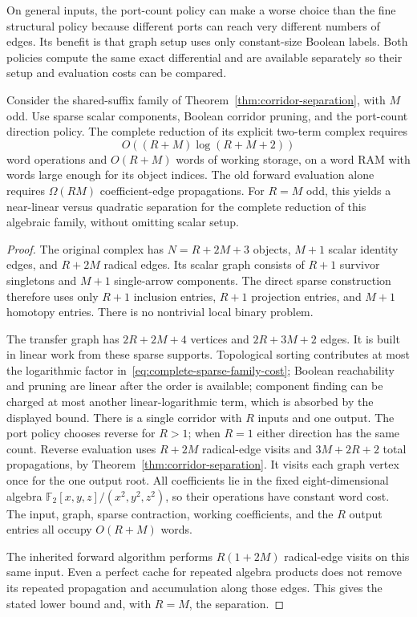 On general inputs, the port-count policy can make a worse choice than the
fine structural policy because different ports can reach very different
numbers of edges.  Its benefit is that graph setup uses only constant-size
Boolean labels.  Both policies compute the same exact differential and are
available separately so their setup and evaluation costs can be compared.

\begin{theorem}
\label{thm:complete-sparse-separation}
Consider the shared-suffix family of
Theorem~\ref{thm:corridor-separation}, with $M$ odd.  Use sparse scalar
components, Boolean corridor pruning, and the port-count direction policy.
The complete reduction of its explicit two-term complex requires
\begin{equation}\label{eq:complete-sparse-family-cost}
 O((R+M)\log(R+M+2))
\end{equation}
word operations and $O(R+M)$ words of working storage, on a word RAM with
words large enough for its object indices.  The old forward evaluation
alone requires $\Omega(RM)$ coefficient-edge propagations.  For $R=M$ odd,
this yields a near-linear versus quadratic separation for the complete
reduction of this algebraic family, without omitting scalar setup.
\end{theorem}

\begin{proof}
The original complex has $N=R+2M+3$ objects, $M+1$ scalar identity edges,
and $R+2M$ radical edges.  Its scalar graph consists of $R+1$ survivor
singletons and $M+1$ single-arrow components.  The direct sparse construction
therefore uses only $R+1$ inclusion entries, $R+1$ projection entries, and
$M+1$ homotopy entries.  There is no nontrivial local binary problem.

The transfer graph has $2R+2M+4$ vertices and $2R+3M+2$ edges.  It is built
in linear work from these sparse supports.  Topological sorting contributes
at most the logarithmic factor in~\eqref{eq:complete-sparse-family-cost};
Boolean reachability and pruning are linear after the order is available;
component finding can be charged at most another linear-logarithmic term,
which is absorbed by the displayed bound. There is a single corridor with $R$ inputs and one
output.  The port policy chooses reverse for $R>1$; when $R=1$ either
direction has the same count.  Reverse evaluation uses $R+2M$ radical-edge
visits and $3M+2R+2$ total propagations, by
Theorem~\ref{thm:corridor-separation}.  It visits each graph vertex once for
the one output root.  All coefficients lie in the fixed eight-dimensional
algebra $\mathbb F_2[x,y,z]/(x^2,y^2,z^2)$, so their operations have constant
word cost.  The input, graph, sparse contraction, working coefficients, and
the $R$ output entries all occupy $O(R+M)$ words.

The inherited forward algorithm performs $R(1+2M)$ radical-edge visits on
this same input.  Even a perfect cache for repeated algebra products does
not remove its repeated propagation and accumulation along those edges.
This gives the stated lower bound and, with $R=M$, the separation.
\end{proof}

